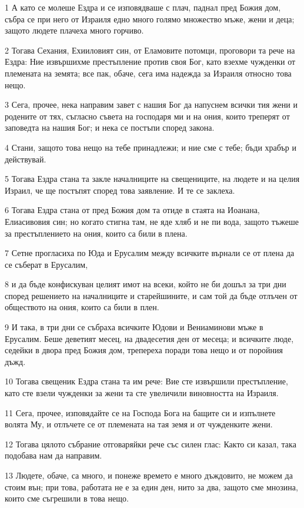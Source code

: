 \par 1 А като се молеше Ездра и се изповядваше с плач, паднал пред Божия дом, събра се при него от Израиля едно много голямо множество мъже, жени и деца; защото людете плачеха много горчиво.
\par 2 Тогава Сехания, Ехииловият син, от Еламовите потомци, проговори та рече на Ездра: Ние извършихме престъпление против своя Бог, като взехме чужденки от племената на земята; все пак, обаче, сега има надежда за Израиля относно това нещо.
\par 3 Сега, прочее, нека направим завет с нашия Бог да напуснем всички тия жени и родените от тях, съгласно съвета на господаря ми и на ония, които треперят от заповедта на нашия Бог; и нека се постъпи според закона.
\par 4 Стани, защото това нещо на тебе принадлежи; и ние сме с тебе; бъди храбър и действувай.
\par 5 Тогава Ездра стана та закле началниците на свещениците, на людете и на целия Израил, че ще постъпят според това заявление. И те се заклеха.
\par 6 Тогава Ездра стана от пред Божия дом та отиде в стаята на Иоанана, Елиасивовия син; но когато стигна там, не яде хляб и не пи вода, защото тъжеше за престъплението на ония, които са били в плена.
\par 7 Сетне прогласиха по Юда и Ерусалим между всичките върнали се от плена да се съберат в Ерусалим,
\par 8 и да бъде конфискуван целият имот на всеки, който не би дошъл за три дни според решението на началниците и старейшините, и сам той да бъде отлъчен от обществото на ония, които са били в плен.
\par 9 И така, в три дни се събраха всичките Юдови и Вениаминови мъже в Ерусалим. Беше деветият месец, на двадесетия ден от месеца; и всичките люде, седейки в двора пред Божия дом, трепереха поради това нещо и от поройния дъжд.
\par 10 Тогава свещеник Ездра стана та им рече: Вие сте извършили престъпление, като сте взели чужденки за жени та сте увеличили виновността на Израиля.
\par 11 Сега, прочее, изповядайте се на Господа Бога на бащите си и изпълнете волята Му, и отлъчете се от племената на тая земя и от чужденките жени.
\par 12 Тогава цялото събрание отговаряйки рече със силен глас: Както си казал, така подобава нам да направим.
\par 13 Людете, обаче, са много, и понеже времето е много дъждовито, не можем да стоим вън; при това, работата не е за един ден, нито за два, защото сме мнозина, които сме съгрешили в това нещо.
